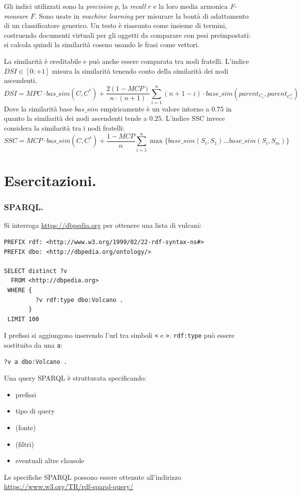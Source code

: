 \documentclass[11pt]{article}
\begin{document}
Gli indici utilizzati sono la \textit{precision} $p$, la \textit{recall} $r$ e la loro media armonica \textit{F-measure} $F$.
Sono usate in \textit{machine learning} per misurare la bontà di adattamento di un classificatore generico.
Un testo è riassunto come insieme di termini, costruendo documenti virtuali per gli oggetti da comparare con pesi preimpostati: si calcola quindi la similarità coseno usando le frasi come vettori.

La similarità è ereditabile e può anche essere comparata tra nodi fratelli.
L'indice $DSI \in [0; +1]$ misura la similarità tenendo conto della similarità dei nodi ascendenti.
\begin{equation*}
  DSI = MPC \cdot bas\_sim(C, C^*) + \frac{2(1 - MCP)}{n \cdot (n + 1)} \sum_{i=1}^n(n + 1 - i) \cdot base\_sim(parent_{C_i}, parent_{C^*_i})
\end{equation*}
Dove la similarità base $bas\_sim$ empiricamente è un valore intorno a $0.75$ in quanto la similarità dei nodi ascendenti tende a $0.25$. \newline
L'indice SSC invece considera la similarità tra i nodi fratelli:
\begin{equation*}
  SSC = MCP \cdot bas\_sim(C, C^*) + \frac{1-MCP}{n}\sum_{i=1}^n{\max\{base\_sim(S_i, S_1) ... base\_sim(S_i, S_m)\}}
\end{equation*}

\newpage
\part{Esercitazioni.}

\section{SPARQL.}
Si interroga \url{https://dbpedia.org} per ottenere una lista di vulcani:
\begin{verbatim}
PREFIX rdf: <http://www.w3.org/1999/02/22-rdf-syntax-ns#>
PREFIX dbo: <http://dbpedia.org/ontology/>

SELECT distinct ?v
  FROM <http://dbpedia.org>
 WHERE {
         ?v rdf:type dbo:Volcano .
       }
 LIMIT 100
\end{verbatim}
I prefissi si aggiungono inserendo l'url tra simboli \verb|<| e \verb|>|.
\verb|rdf:type| può essere sostituito da una \verb|a|:
\begin{verbatim}
?v a dbo:Volcano .
\end{verbatim}

Una query SPARQL è strutturata specificando:
\begin{itemize}
  \item prefissi
  \item tipo di query
  \item (fonte)
  \item (filtri)
  \item eventuali altre clausole
\end{itemize}
Le specifiche SPARQL possono essere ottenute all'indirizzo \url{https://www.w3.org/TR/rdf-sparql-query/}
\end{document}
